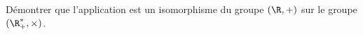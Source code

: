 Démontrer que l'application  est un isomorphisme du groupe $(\R, +)$ sur le groupe $(\R^\ast_+, \times)$.